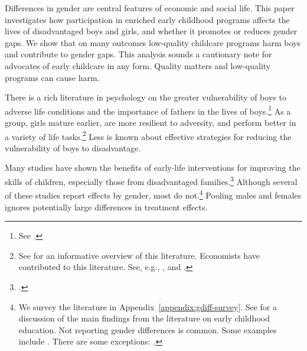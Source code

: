 Differences in gender are central features of economic and social life. This paper investigates how participation in enriched early childhood programs affects the lives of disadvantaged boys and girls, and whether it promotes or reduces gender gaps. We show that on many outcomes low-quality childcare programs harm boys and contribute to gender gaps. This analysis sounds a cautionary note for advocates of early childcare in any form. Quality matters and low-quality programs can cause harm.

There is a rich literature in psychology on the greater vulnerability of boys to adverse life conditions and the importance of fathers in the lives of boys.\footnote{See \citet{golding2016psychology}.} As a group, girls mature earlier, are more resilient to adversity, and perform better in a variety of life tasks.\footnote{See \citet{Schore_2017_IMHJ} for an informative overview of this literature. Economists have contributed to this literature. See, e.g., \citet{Bertrand_Pan_2013_AEJAE}, \citet{Autor-etal_2015_Family-Disadvantage} and \citet{Kottelenberg-Lehrer_2014_Gender-Effects}.} Less is known about effective strategies for reducing the vulnerability of boys to disadvantage.

Many studies have shown the benefits of early-life interventions for improving the skills of children, especially those from disadvantaged families.\footnote{\citet{Currie_2011_AER,Elango_Hojman_etal_2016_Early-Edu}.} Although several of these studies report effects by gender, most do not.\footnote{We survey the literature in Appendix~\ref{appendix:gdiff-survey}. See \citet{Elango_Hojman_etal_2016_Early-Edu} for a discussion of the main findings from the literature on early childhood education. Not reporting gender differences is common. Some examples include \citet{Bernal_Keane_2011_JoLE,Cascio_Schanzenbach_2013_ImpactsExpandingAccess,Bitler_et_al_2014_Head_Start_Unpublished,Kline_Walters_2016_QJE}. There are some exceptions: \citet{Heckman_Moon_etal_2010_QE,Campbell_Conti_etal_2014_EarlyChildhoodInvestments,Garcia_Heckman_Leaf_etal_2017_Comp_CBA_Unpublished}.} Pooling males and females ignores potentially large differences in treatment effects.

